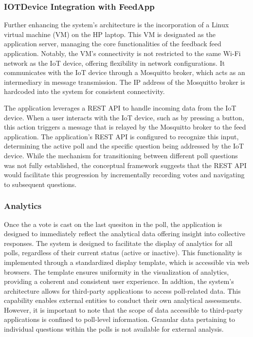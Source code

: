 \subsubsection{IOTDevice Integration with FeedApp}
Further enhancing the system's architecture is the incorporation of a Linux virtual machine (VM) on the HP laptop. This VM is designated as the application server, managing the core functionalities of the feedback feed application. Notably, the VM's connectivity is not restricted to the same Wi-Fi network as the IoT device, offering flexibility in network configurations. It communicates with the IoT device through a Mosquitto broker, which acts as an intermediary in message transmission. The IP address of the Mosquitto broker is hardcoded into the system for consistent connectivity.

The application leverages a REST API to handle incoming data from the IoT device. When a user interacts with the IoT device, such as by pressing a button, this action triggers a message that is relayed by the Mosquitto broker to the feed application. The application's REST API is configured to recognize this input, determining the active poll and the specific question being addressed by the IoT device. While the mechanism for transitioning between different poll questions was not fully established, the conceptual framework suggests that the REST API would facilitate this progression by incrementally recording votes and navigating to subsequent questions.

\subsubsection{Analytics}
Once the a vote is cast on the last quesiton in the poll, the application is designed to immediately reflect the analytical data offering insight into collective responses.  The system is designed to facilitate the display of analytics for all polls, regardless of their current status (active or inactive).  This functionality is implemented through a standardized display template, which is accessible via web browsers. The template ensures uniformity in the visualization of analytics, providing a coherent and consistent user experience. In addtion, the system's architecture allows for third-party applications to access poll-related data.  This capability enables external entities to conduct their own analytical assessments.  However, it is important to note that the scope of data accessible to third-party applications is confined to poll-level information. Granular data pertaining to individual questions within the polls is not available for external analysis.

